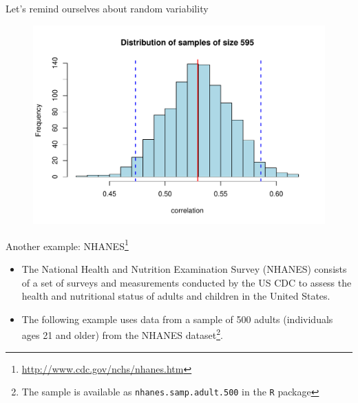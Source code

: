 \documentclass[10pt]{beamer}\usepackage[]{graphicx}\usepackage[]{color}
\makeatletter
\def\maxwidth{ %
  \ifdim\Gin@nat@width>\linewidth
    \linewidth
  \else
    \Gin@nat@width
  \fi
}
\newenvironment{knitrout}{}{} %
\makeatother
\begin{document}
\begin{frame}[fragile]{Let's remind ourselves about random variability}
\begin{figure}
\begin{minipage}[h]{0.59\linewidth}
\begin{knitrout}
{\centering \includegraphics[width=\maxwidth]{figure/histboot-1} 

}


\end{knitrout}
	\end{minipage}
\end{figure}



\end{frame}



\begin{frame}{Another example: NHANES\footnote{\tiny{\url{http://www.cdc.gov/nchs/nhanes.htm}}}}
	\begin{itemize}
		\item The National Health and Nutrition Examination Survey (NHANES) consists of a set of surveys and measurements conducted by the US CDC to assess the health and nutritional status of adults	and children in the United States. 
		\item The following example uses data from a sample of 500 adults (individuals ages 21 and older) from the NHANES dataset\footnote{\tiny{The sample is available as \texttt{nhanes.samp.adult.500} in the \texttt{R}  package}}.
	\end{itemize}
\end{frame}
\end{document}
